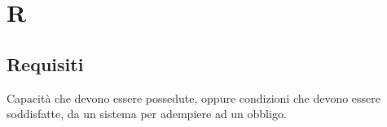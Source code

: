 \section*{R}

\subsection{Requisiti}
Capacità che devono essere possedute, oppure condizioni che devono essere soddisfatte, da un sistema per adempiere ad un obbligo.